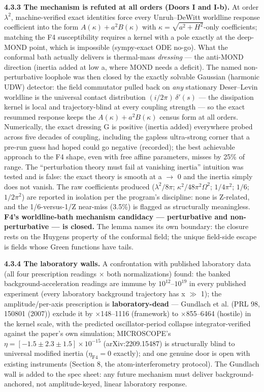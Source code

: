 \documentclass[11pt,a4paper]{article}
\begin{document}
\textbf{4.3.3 The mechanism is refuted at all orders (Doors I and I-b).} At order $\lambda^{2}$, machine-verified exact identities force every Unruh--DeWitt worldline response coefficient into the form $A(\kappa) + a^2B(\kappa)$ with $\kappa = \sqrt{a^2+H^2}$-only coefficients; matching the F4 susceptibility requires a kernel with a pole exactly at the deep-MOND point, which is impossible (sympy-exact ODE no-go). What the conformal bath actually delivers is thermal-mass \emph{dressing} --- the anti-MOND direction (inertia added at low a, where MOND needs a deficit). The named non-perturbative loophole was then closed by the exactly solvable Gaussian (harmonic UDW) detector: the field commutator pulled back on \emph{any} stationary Deser--Levin worldline is the universal contact distribution $(i/2\pi)\,\delta'(s)$ --- the dissipation kernel is local and trajectory-blind at every coupling strength --- so the exact resummed response keeps the $A(\kappa) + a^2B(\kappa)$ census form at all orders. Numerically, the exact dressing G is positive (inertia added) everywhere probed across five decades of coupling, including the gapless ultra-strong corner that a pre-run guess had hoped could go negative (recorded); the best achievable approach to the F4 shape, even with free affine parameters, misses by 25\% of range. The ``perturbation theory must fail at vanishing inertia'' intuition was tested and is false: the exact theory is smooth at a $\to$ 0 and the inertia simply does not vanish. The raw coefficients produced ($\lambda^2/8\pi$; $\kappa^2/48\pi^2\Omega^2$; $1/4\pi^2$; $1/6$; $1/2\pi^2$) are reported in isolation per the program's discipline: none is Z-related, and the 1/6-versus-1/Z near-miss (3.5\%) is flagged as structurally meaningless. \textbf{F4's worldline-bath mechanism candidacy --- perturbative and non-perturbative --- is closed.} The lemma names its own boundary: the closure rests on the Huygens property of the conformal field; the unique field-side escape is fields whose Green functions have tails.

\textbf{4.3.4 The laboratory walls.} A confrontation with published laboratory data (all four prescription readings $\times$ both normalizations) found: the banked background-acceleration readings are immune by $10^{12}$--$10^{19}$ in every published experiment (every laboratory background trajectory has x $\gg$ 1); the amplitude/per-axis prescription is \textbf{laboratory-dead} --- Gundlach et al. (PRL 98, 150801 (2007)) exclude it by $\times$148--1116 (framework) to $\times$855--6464 (hostile) in the kernel scale, with the predicted oscillator-period collapse integrator-verified against the paper's own simulation; MICROSCOPE's $\eta = [-1.5 \pm 2.3 \pm 1.5]\times10^{-15}$ (arXiv:2209.15487) is structurally blind to universal modified inertia ($\eta_{\mathrm{F4}} = 0$ exactly); and one genuine door is open with existing instruments (Section 8, the atom-interferometry protocol). The Gundlach wall is added to the spec sheet: any future mechanism must deliver background-anchored, not amplitude-keyed, linear laboratory response.
\end{document}
